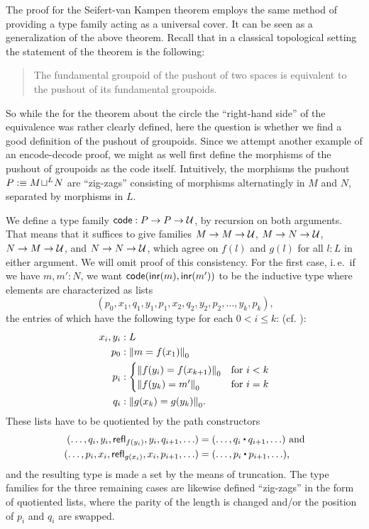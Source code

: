 The proof for the Seifert-van Kampen theorem employs the same method of
providing a type family acting as a universal cover.
It can be seen as a generalization of the above theorem.
Recall that in a classical topological setting the statement of the
theorem is the following:
\begin{quote}
The fundamental groupoid of the pushout of two spaces is equivalent to the pushout of
its fundamental groupoids.
\end{quote}
So while the for the theorem about the circle the ``right-hand side'' of the
equivalence was rather clearly defined, here the
question is whether we find a good definition of the pushout of groupoids.
Since we attempt another example of an encode-decode proof, we
might as well first define the morphisms of the pushout of groupoids as the
code itself.
Intuitively, the morphisms the pushout $P :\equiv \pout{L}{M}{N}$
are ``zig-zags'' consisting of morphisms
alternatingly in ${M}$ and ${N}$, separated by morphisms in $L$.
\begin{defn}
We define a type family $\code : P \to P \to \UU$, by recursion on both arguments.
That means that it suffices to give families $M \to M \to \UU$,
$M \to N \to \UU$, $N \to M \to \UU$, and $N \to N \to \UU$, which agree on
$f(l)$ and $g(l)$ for all $l : L$ in either argument.
We will omit proof of this consistency.
For the first case, i.\,e.\ if we have $m, m' : N$, we want $\code(\inr(m), \inr(m'))$ to be
the inductive type where elements are characterized as lists
\begin{equation*}
 (p_0, x_1, q_1, y_1, p_1, x_2, q_2, y_2, p_2, \ldots, y_k, p_k) \text{,}
\end{equation*}
the entries of which have the following type for each $0 < i \leq k$: (cf. ):
\begin{align*}
x_i, y_i &: L \\
p_0 &: \trunc{0}{m = f(x_1)} \\
p_i &: \begin{cases} \trunc{0}{f(y_i) = f(x_{k + 1})} & \text{for $i < k$} \\
  \trunc{0}{f(y_k) = m'} & \text{for $i = k$}  \end{cases} \\
q_i &: \trunc{0}{g(x_k) = g(y_k)} \text{.}
\end{align*}
These lists have to be quotiented by the path constructors
\begin{align*}
(\ldots, q_i, y_i, \refl_{f(y_i)}, y_i, q_{i+1}, \ldots)
  &= (\ldots, q_i \ct q_{i+1}, \ldots) \text{ and} \\
(\ldots, p_i, x_i, \refl_{g(x_i)}, x_i, p_{i+1}, \ldots)
  &= (\ldots, p_i \ct p_{i+1}, \ldots) \text{,}
\end{align*}
and the resulting type is made a set by the means of truncation.
The type families for the three remaining cases are likewise defined
``zig-zags'' in the form of quotiented lists, where the parity of the length
is changed and/or the position of $p_i$ and $q_i$ are swapped.
\end{defn}

